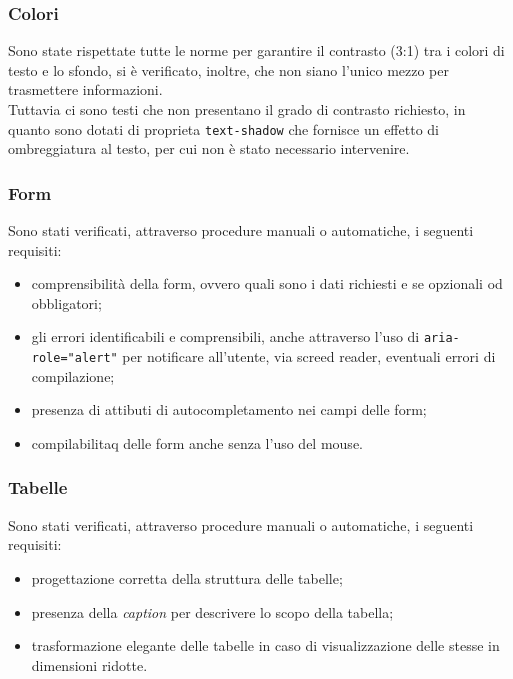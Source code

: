 \subsubsection{Colori}
\label{subsubsec:accessibility-colors}
Sono state rispettate tutte le norme per garantire il contrasto (3:1) tra i colori di testo e lo sfondo, si è verificato, inoltre, che non siano l'unico mezzo per trasmettere informazioni. \\
Tuttavia ci sono testi che non presentano il grado di contrasto richiesto, in quanto sono dotati di proprieta \texttt{text-shadow} che fornisce un effetto di ombreggiatura al testo, per cui non è stato necessario intervenire.

\subsubsection{Form}
\label{subsubsec:accessibility-forms}
Sono stati verificati, attraverso procedure manuali o automatiche, i seguenti requisiti:
\begin{itemize}
    \item comprensibilità della form, ovvero quali sono i dati richiesti e se opzionali od obbligatori;
    \item gli errori identificabili e comprensibili, anche attraverso l'uso di \texttt{aria-role="alert"} per notificare all'utente, via screed reader, eventuali errori di compilazione;
    \item presenza di attibuti di autocompletamento nei campi delle form;
    \item compilabilitaq delle form anche senza l'uso del mouse.
\end{itemize}

\subsubsection{Tabelle}
\label{subsubsec:accessibility-tables}
Sono stati verificati, attraverso procedure manuali o automatiche, i seguenti requisiti:
\begin{itemize}
    \item progettazione corretta della struttura delle tabelle;
    \item presenza della \textit{caption} per descrivere lo scopo della tabella;
    \item trasformazione elegante delle tabelle in caso di visualizzazione delle stesse in dimensioni ridotte.
\end{itemize}

